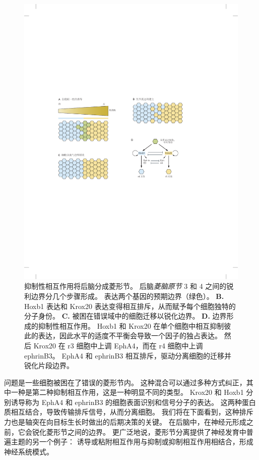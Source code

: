 \begin{figure}[htbp]
	\centering
	\includegraphics[width=0.89\linewidth]{chap45/fig_45_7}
	\caption{抑制性相互作用将后脑分成菱形节。
		后脑\textit{菱脑原节} 3 和 4 之间的锐利边界分几个步骤形成\cite{addison2016segment}。
		表达两个基因的预期边界（绿色）。
		\textbf{B.} Hoxb1 表达和 Krox20 表达变得相互排斥，从而赋予每个细胞独特的分子身份。
		\textbf{C.} 被困在错误域中的细胞迁移以锐化边界。
		\textbf{D.} 边界形成的抑制性相互作用。
		Hoxb1 和 Krox20 在单个细胞中相互抑制彼此的表达，因此水平的适度不平衡会导致一个因子的独占表达。
		然后 Krox20 在 r3 细胞中上调 EphA4，而在 r4 细胞中上调 ephrinB3。
		EphA4 和 ephrinB3 相互排斥，驱动分离细胞的迁移并锐化片段边界。}
	\label{fig:45_7}
\end{figure}


问题是一些细胞被困在了错误的菱形节内。
这种混合可以通过多种方式纠正，其中一种是第二种抑制相互作用，这是一种明显不同的类型。
Krox20 和 Hoxb1 分别诱导称为 EphA4 和 ephrinB3 的细胞表面识别和信号分子的表达。
这两种蛋白质相互结合，导致传输排斥信号，从而分离细胞。
我们将在下面看到，这种排斥力也是轴突在向目标生长时做出的后期决策的关键。
在后脑中，在神经元形成之前，它会锐化菱形节之间的边界。
更广泛地说，菱形节分离提供了神经发育中普遍主题的另一个例子：
诱导或粘附相互作用与抑制或抑制相互作用相结合，形成神经系统模式。




